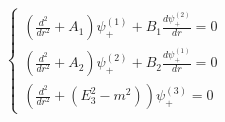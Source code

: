 \begin{equation}
\label{14}\left\{ 
\begin{array}{c}
\left( 
\frac{d^2}{dr^2}+A_1\right) \psi _{+}^{(1)}+B_1\frac{d\psi _{+}^{(2)}}{dr}=0
\\ \left( 
\frac{d^2}{dr^2}+A_2\right) \psi _{+}^{(2)}+B_2\frac{d\psi _{+}^{(1)}}{dr}=0
\\ \left( \frac{d^2}{dr^2}+\left( E_3^2-m^2\right) \right) \psi _{+}^{(3)}=0 
\end{array}
\right. 
\end{equation}

